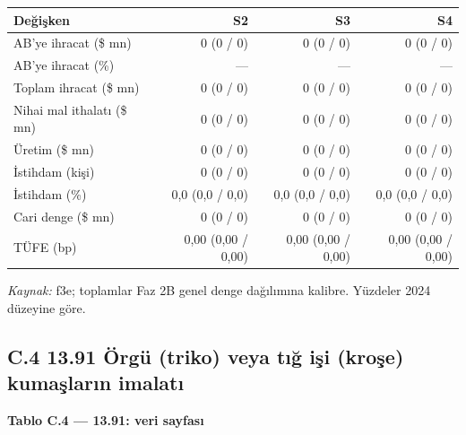 \begin{longtable}[]{@{}lrrr@{}}
\toprule\noalign{}
\textbf{Değişken} & \textbf{S2} & \textbf{S3} & \textbf{S4} \\
\midrule\noalign{}
\endhead
\bottomrule\noalign{}
\endlastfoot
AB'ye ihracat (\$ mn) & 0 (0 / 0) & 0 (0 / 0) & 0 (0 / 0) \\
AB'ye ihracat (\%) & --- & --- & --- \\
Toplam ihracat (\$ mn) & 0 (0 / 0) & 0 (0 / 0) & 0 (0 / 0) \\
Nihai mal ithalatı (\$ mn) & 0 (0 / 0) & 0 (0 / 0) & 0 (0 / 0) \\
Üretim (\$ mn) & 0 (0 / 0) & 0 (0 / 0) & 0 (0 / 0) \\
İstihdam (kişi) & 0 (0 / 0) & 0 (0 / 0) & 0 (0 / 0) \\
İstihdam (\%) & 0,0 (0,0 / 0,0) & 0,0 (0,0 / 0,0) & 0,0 (0,0 / 0,0) \\
Cari denge (\$ mn) & 0 (0 / 0) & 0 (0 / 0) & 0 (0 / 0) \\
TÜFE (bp) & 0,00 (0,00 / 0,00) & 0,00 (0,00 / 0,00) & 0,00 (0,00 / 0,00) \\
\end{longtable}

\endgroup

\emph{Kaynak:} \etiketT{} f3e; toplamlar Faz 2B genel denge dağılımına kalibre. Yüzdeler 2024 düzeyine göre.

\hypertarget{nace_kartlar_13-15-c4-1391-uxf6rguxfc-triko-veya-tux131ux11f-iux15fi-kroux15fe-kumaux15flarux131n-imalatux131}{%
\subsection{C.4 13.91 Örgü (triko) veya tığ işi (kroşe) kumaşların imalatı}\label{nace_kartlar_13-15-c4-1391-uxf6rguxfc-triko-veya-tux131ux11f-iux15fi-kroux15fe-kumaux15flarux131n-imalatux131}}


\textbf{Tablo C.4 --- 13.91: veri sayfası}

\nopagebreak[4]

\begingroup\gbtablo\small

